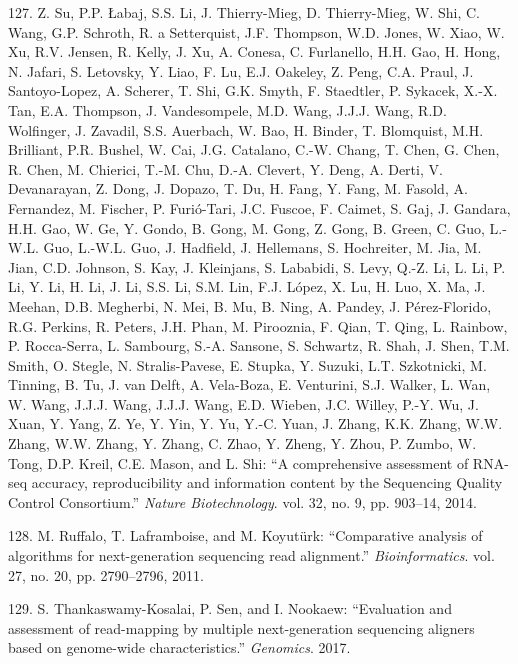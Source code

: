 \documentclass[12pt,twoside]{reedthesis}
\theoremstyle{definition}
\theoremstyle{definition}
\theoremstyle{remark}
\begin{document}
  \hypertarget{ref-Su2014}{}
  127. Z. Su, P.P. Łabaj, S.S. Li, J. Thierry-Mieg, D. Thierry-Mieg, W.
  Shi, C. Wang, G.P. Schroth, R. a Setterquist, J.F. Thompson, W.D. Jones,
  W. Xiao, W. Xu, R.V. Jensen, R. Kelly, J. Xu, A. Conesa, C. Furlanello,
  H.H. Gao, H. Hong, N. Jafari, S. Letovsky, Y. Liao, F. Lu, E.J. Oakeley,
  Z. Peng, C.A. Praul, J. Santoyo-Lopez, A. Scherer, T. Shi, G.K. Smyth,
  F. Staedtler, P. Sykacek, X.-X. Tan, E.A. Thompson, J. Vandesompele,
  M.D. Wang, J.J.J. Wang, R.D. Wolfinger, J. Zavadil, S.S. Auerbach, W.
  Bao, H. Binder, T. Blomquist, M.H. Brilliant, P.R. Bushel, W. Cai, J.G.
  Catalano, C.-W. Chang, T. Chen, G. Chen, R. Chen, M. Chierici, T.-M.
  Chu, D.-A. Clevert, Y. Deng, A. Derti, V. Devanarayan, Z. Dong, J.
  Dopazo, T. Du, H. Fang, Y. Fang, M. Fasold, A. Fernandez, M. Fischer, P.
  Furió-Tari, J.C. Fuscoe, F. Caimet, S. Gaj, J. Gandara, H.H. Gao, W. Ge,
  Y. Gondo, B. Gong, M. Gong, Z. Gong, B. Green, C. Guo, L.-W.L. Guo,
  L.-W.L. Guo, J. Hadfield, J. Hellemans, S. Hochreiter, M. Jia, M. Jian,
  C.D. Johnson, S. Kay, J. Kleinjans, S. Lababidi, S. Levy, Q.-Z. Li, L.
  Li, P. Li, Y. Li, H. Li, J. Li, S.S. Li, S.M. Lin, F.J. López, X. Lu, H.
  Luo, X. Ma, J. Meehan, D.B. Megherbi, N. Mei, B. Mu, B. Ning, A. Pandey,
  J. Pérez-Florido, R.G. Perkins, R. Peters, J.H. Phan, M. Pirooznia, F.
  Qian, T. Qing, L. Rainbow, P. Rocca-Serra, L. Sambourg, S.-A. Sansone,
  S. Schwartz, R. Shah, J. Shen, T.M. Smith, O. Stegle, N. Stralis-Pavese,
  E. Stupka, Y. Suzuki, L.T. Szkotnicki, M. Tinning, B. Tu, J. van Delft,
  A. Vela-Boza, E. Venturini, S.J. Walker, L. Wan, W. Wang, J.J.J. Wang,
  J.J.J. Wang, E.D. Wieben, J.C. Willey, P.-Y. Wu, J. Xuan, Y. Yang, Z.
  Ye, Y. Yin, Y. Yu, Y.-C. Yuan, J. Zhang, K.K. Zhang, W.W. Zhang, W.W.
  Zhang, Y. Zhang, C. Zhao, Y. Zheng, Y. Zhou, P. Zumbo, W. Tong, D.P.
  Kreil, C.E. Mason, and L. Shi: ``A comprehensive assessment of RNA-seq
  accuracy, reproducibility and information content by the Sequencing
  Quality Control Consortium.'' \emph{Nature Biotechnology}. vol. 32, no.
  9, pp. 903--14, 2014.
  
  \hypertarget{ref-Ruffalo2011}{}
  128. M. Ruffalo, T. Laframboise, and M. Koyutürk: ``Comparative analysis
  of algorithms for next-generation sequencing read alignment.''
  \emph{Bioinformatics}. vol. 27, no. 20, pp. 2790--2796, 2011.
  
  \hypertarget{ref-Thankaswamy-Kosalai2017}{}
  129. S. Thankaswamy-Kosalai, P. Sen, and I. Nookaew: ``Evaluation and
  assessment of read-mapping by multiple next-generation sequencing
  aligners based on genome-wide characteristics.'' \emph{Genomics}. 2017.
  
\end{document}
